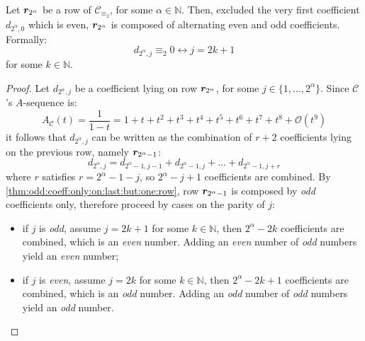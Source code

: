 \begin{theorem}
    Let $\boldsymbol{r}_{2^{\alpha}}$ be a row of $\mathcal{C}_{\equiv_{2}}$,
    for some $\alpha\in\mathbb{N}$. Then, excluded the very first coefficient
    $d_{2^{\alpha},0}$ which is even, $\boldsymbol{r}_{2^{\alpha}}$ is composed of
    alternating even and odd coefficients. Formally:
    \begin{displaymath}
        d_{2^{\alpha},j}\equiv_{2}0 \leftrightarrow j = 2k+1
    \end{displaymath}
    for some $k\in\mathbb{N}$.
\end{theorem}

\begin{proof}
    Let $d_{2^{\alpha},j}$ be a coefficient lying on row $\boldsymbol{r}_{2^{\alpha}}$,
    for some $j\in\lbrace1,\ldots,2^{\alpha}\rbrace$. Since $\mathcal{C}$'s $A$-sequence is:
    \begin{displaymath}
        A_{\mathcal{C}}(t)=\frac{1}{1-t}=1+t+t^{2}+t^{3}+t^{4}+t^{5}+t^{6}+t^{7}+t^{8}+
            \mathcal{O}(t^{9})
    \end{displaymath}
    it follows that $d_{2^{\alpha},j}$ can be written as the combination of $r+2$
    coefficients lying on the previous row, namely $\boldsymbol{r}_{2^{\alpha}-1}$:
    \begin{displaymath}
        d_{2^{\alpha},j} = d_{2^{\alpha}-1,j-1} +d_{2^{\alpha}-1,j} +\ldots+d_{2^{\alpha}-1,j+r}
    \end{displaymath}
    where $r$ satisfies $r=2^{\alpha}-1-j$, so $2^{\alpha}-j+1$ coefficients are
    combined.  By \autoref{thm:odd:coeff:only:on:last:but:one:row},
    row $\boldsymbol{r}_{2^{\alpha}-1}$ is composed by \emph{odd}
    coefficients only, therefore proceed by cases on the parity of $j$:
    \begin{itemize}
        \item if $j$ is \emph{odd}, assume $j=2k+1$ for some $k\in\mathbb{N}$, then
            $2^{\alpha}-2k$ coefficients are combined, which is an \emph{even} number.
            Adding an \emph{even} number of \emph{odd} numbers yield an \emph{even} number;
        \item if $j$ is \emph{even}, assume $j=2k$ for some $k\in\mathbb{N}$, then
            $2^{\alpha}-2k+1$ coefficients are combined, which is an \emph{odd} number.
            Adding an \emph{odd} number of \emph{odd} numbers yield an \emph{odd} number.
    \end{itemize}
\end{proof}


